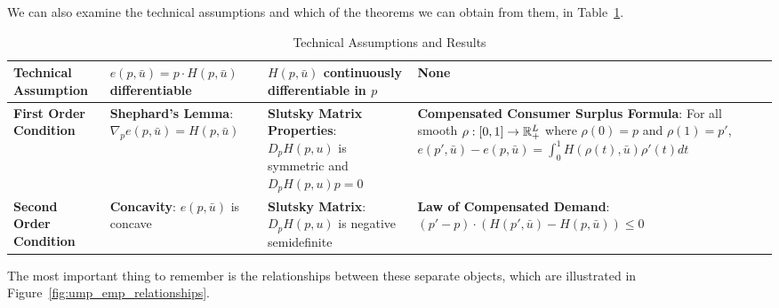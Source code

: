 \documentclass[12pt]{article}
\begin{document}
We can also examine the technical assumptions and which of the theorems we can obtain from them, in Table~\ref{tab:assumptions_lemmas_ump_emp}.

\begin{table}[H]\label{tab:assumptions_lemmas_ump_emp}
	\footnotesize
	\centering
	\begin{tabular}{|>{\centering\arraybackslash}m{3.75cm}|>{\centering\arraybackslash}m{3.75cm}|>{\centering\arraybackslash}m{3.75cm}| >{\centering\arraybackslash}m{3.75cm}|}
	\hline
	\textbf{Technical Assumption} & $e(p,\bar{u}) = p \cdot H(p,\bar{u})$ differentiable & $H(p,\bar{u})$ continuously differentiable in $p$ & None\\
	\hline
	\textbf{First Order Condition} & \textbf{Shephard's Lemma}: $\nabla_p e(p,\bar{u}) = H(p,\bar{u})$  & \textbf{Slutsky Matrix Properties}: $D_p H(p,u)$ is symmetric and $D_p H(p,u)p = 0$ & \textbf{Compensated Consumer Surplus Formula}: For all smooth $\rho : [0,1] \to \mathbb{R}^L_+$ where $\rho(0) = p$ and $\rho(1) = p'$, $e(p',\bar{u}) - e(p,\bar{u}) = \int_0^1 H(\rho(t),\bar{u})\rho'(t)dt$  \\
	\hline
	\textbf{Second Order Condition} & \textbf{Concavity}: $e(p,\bar{u})$ is concave & \textbf{Slutsky Matrix}: $D_pH(p,u)$ is negative semidefinite & \textbf{Law of Compensated Demand}: $(p' - p) \cdot (H(p',\bar{u}) - H(p,\bar{u})) \le 0$ \\
	\hline
	\end{tabular}
	\caption{Technical Assumptions and Results}
\end{table}

The most important thing to remember is the relationships between these separate objects, which are illustrated in Figure~\ref{fig:ump_emp_relationships}.
\end{document}
